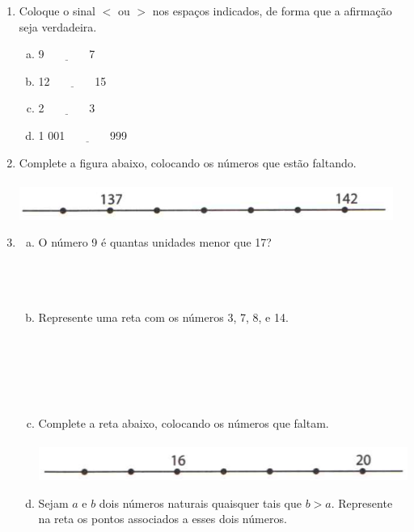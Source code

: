 \documentclass[a4paper,14pt]{article}
\begin{document}
\begin{multicols}{2}
\begin{enumerate}
			\item Coloque o sinal $<$ ou $>$ nos espaços indicados, de forma que a afirmação seja verdadeira.
			\begin{enumerate}[a)]
				\item 9 $\underline{~~~~~~~~~~~~~~~}$ 7
				\item 12 $\underline{~~~~~~~~~~~~~~~}$ 15
				\item 2 $\underline{~~~~~~~~~~~~~~~}$ 3
				\item 1 001 $\underline{~~~~~~~~~~~~~~~}$ 999
			\end{enumerate}
			\item Complete a figura abaixo, colocando os números que estão faltando. \\\\
			\includegraphics[width=1\linewidth]{6FMA17_imagens/imagem2}
			\item \begin{enumerate}[a)]
				\item O número 9 é quantas unidades menor que 17? \\\\\\\\
				\item Represente uma reta com os números 3, 7, 8, e 14. \\\\\\\\\\\\
				\item Complete a reta abaixo, colocando os números que faltam. \\\\
				\includegraphics[width=1\linewidth]{6FMA17_imagens/imagem3}
				\item Sejam $a$ e $b$ dois números naturais quaisquer tais que $b > a$. Represente na reta os pontos associados a esses dois números.
			\end{enumerate}
		\end{enumerate}

\end{multicols}
\end{document}
